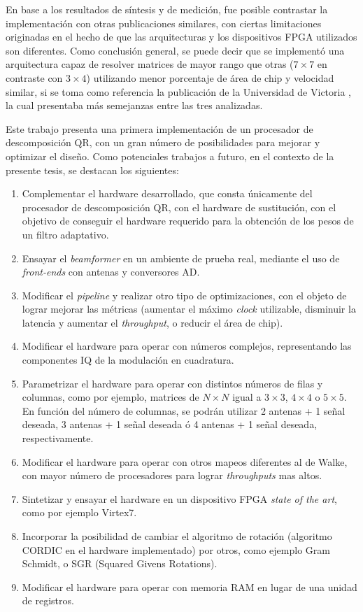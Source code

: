 En base a los resultados de síntesis y de medición, fue posible contrastar la implementación con otras publicaciones similares, con ciertas limitaciones originadas en el hecho de que las arquitecturas y los dispositivos FPGA utilizados son diferentes. Como conclusión general, se puede decir que se implementó una arquitectura capaz de resolver matrices de mayor rango que otras ($7 \times 7$ en contraste con $3 \times 4$) utilizando menor porcentaje de área de chip y velocidad similar, si se toma como referencia la publicación de la Universidad de Victoria \cite{DongdongQR}, la cual presentaba más semejanzas entre las tres analizadas.

Este trabajo presenta una primera implementación de un procesador de descomposición QR, con un gran número de posibilidades para mejorar y optimizar el diseño. Como potenciales trabajos a futuro, en el contexto de la presente tesis, se destacan los siguientes:

\begin{enumerate}
	\item Complementar el hardware desarrollado, que consta únicamente del procesador de descomposición QR, con el hardware de sustitución, con el objetivo de conseguir el hardware requerido para la obtención de los pesos de un filtro adaptativo.
	\item Ensayar el \textit{beamformer} en un ambiente de prueba real, mediante el uso de \textit{front-ends} con antenas y conversores AD.
    \item Modificar el \textit{pipeline} y realizar otro tipo de optimizaciones, con el objeto de lograr mejorar las métricas (aumentar el máximo \textit{clock} utilizable, disminuir la latencia y aumentar el \textit{throughput}, o reducir el área de chip).
	\item Modificar el hardware para operar con números complejos, representando las componentes IQ de la modulación en cuadratura.
	\item Parametrizar el hardware para operar con distintos números de filas y columnas, como por ejemplo, matrices de $N \times N$ igual a $3 \times 3$, $4 \times 4$ o $5 \times 5$. En función del número de columnas, se podrán utilizar 2 antenas + 1 señal deseada, 3 antenas + 1 señal deseada ó 4 antenas + 1 señal deseada, respectivamente.
	\item Modificar el hardware para operar con otros mapeos diferentes al de Walke\cite{Walke}, con mayor número de procesadores para lograr \textit{throughputs} mas altos.
	\item Sintetizar y ensayar el hardware en un dispositivo FPGA \textit{state of the art}, como por ejemplo Virtex7.
	\item Incorporar la posibilidad de cambiar el algoritmo de rotación (algoritmo CORDIC en el hardware implementado) por otros, como ejemplo Gram Schmidt, o SGR (Squared Givens Rotations).
	\item Modificar el hardware para operar con memoria RAM en lugar de una unidad de registros.
\end{enumerate}